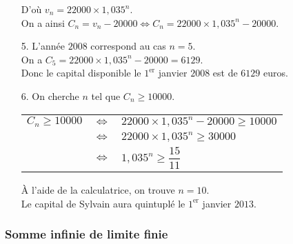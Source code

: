 \begin{itemize}
D'où $v_n = 22000 \times 1,035^n$. \\

On a ainsi $C_n = v_n - 20000 \Longleftrightarrow C_n = 22000 \times 1,035^n - 20000$. \\

\item[5.] L'année $2008$ correspond au cas $n = 5$. \\

On a $C_5 = 22000 \times 1,035^n - 20000 = 6129$. \\

Donc le capital disponible le $1^{\mathrm{er}}$ janvier $2008$ est de $6129$ euros. \\

\item[6.] On cherche $n$ tel que $C_n \geqslant 10000$. \\

\begin{tabular}{lll}
$C_n \geqslant 10000$ & $\Longleftrightarrow$ & $22000 \times 1,035^n - 20000 \geqslant 10000$ \\
& $\Longleftrightarrow$ & $22000 \times 1,035^n \geqslant 30000$ \\
& $\Longleftrightarrow$ & $1,035^n \geqslant \dfrac{15}{11}$ \\
\end{tabular}

\vspace*{.3cm}

À l'aide de la calculatrice, on trouve $n = 10$. \\

Le capital de Sylvain aura quintuplé le $1^{\mathrm{er}}
$ janvier $2013$.

\end{itemize}





















\newpage

\vspace*{-1.8cm}

\subsubsection{Somme infinie de limite finie}

